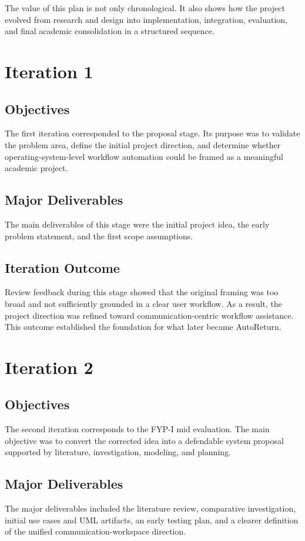 The value of this plan is not only chronological. It also shows how the project evolved from research and design into implementation, integration, evaluation, and final academic consolidation in a structured sequence.

\section{Iteration 1}
\subsection{Objectives}
The first iteration corresponded to the proposal stage. Its purpose was to validate the problem area, define the initial project direction, and determine whether operating-system-level workflow automation could be framed as a meaningful academic project.

\subsection{Major Deliverables}
The main deliverables of this stage were the initial project idea, the early problem statement, and the first scope assumptions.

\subsection{Iteration Outcome}
Review feedback during this stage showed that the original framing was too broad and not sufficiently grounded in a clear user workflow. As a result, the project direction was refined toward communication-centric workflow assistance. This outcome established the foundation for what later became AutoReturn.

\section{Iteration 2}
\subsection{Objectives}
The second iteration corresponds to the FYP-I mid evaluation. The main objective was to convert the corrected idea into a defendable system proposal supported by literature, investigation, modeling, and planning.

\subsection{Major Deliverables}
The major deliverables included the literature review, comparative investigation, initial use cases and UML artifacts, an early testing plan, and a clearer definition of the unified communication-workspace direction.

